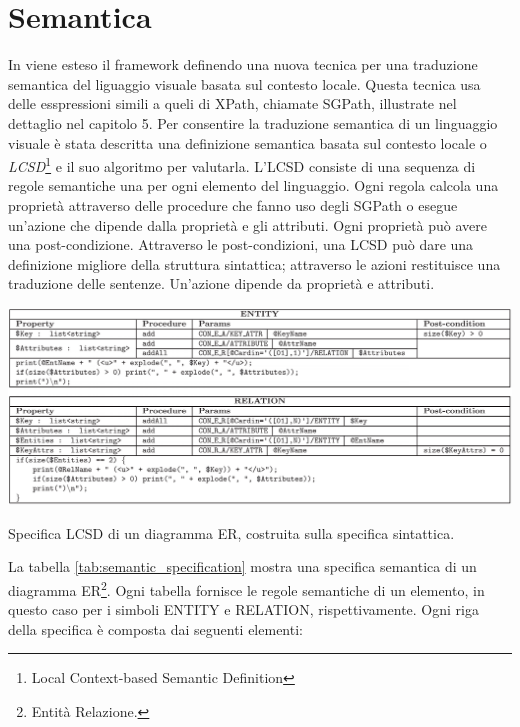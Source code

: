     \section{Semantica}
        In \cite{localcontext} viene esteso il framework definendo una nuova tecnica per una traduzione semantica del liguaggio visuale basata sul contesto locale. Questa tecnica usa delle esspressioni simili a queli di XPath, chiamate SGPath, illustrate nel dettaglio nel capitolo 5.
        \newline
        Per consentire la traduzione semantica di un linguaggio visuale è stata descritta una definizione semantica basata sul contesto locale o \textit{LCSD}\footnote{Local Context-based Semantic Definition} e il suo algoritmo per valutarla. L'LCSD consiste di una sequenza di regole semantiche una per ogni elemento del linguaggio. Ogni regola calcola una proprietà attraverso delle procedure che fanno uso degli SGPath o esegue un'azione che dipende dalla proprietà e gli attributi. Ogni proprietà può avere una post-condizione.
        \newline
        Attraverso le post-condizioni, una LCSD può dare una definizione migliore della struttura sintattica; attraverso le azioni restituisce una traduzione delle sentenze. Un'azione dipende da proprietà e attributi.
        \begin{table}[htbp]
            \centering
            \includegraphics[scale=0.37]{Figure/semantic_specification.PNG}
            \caption{Specifica LCSD di un diagramma ER, costruita sulla specifica sintattica.}
            \label{tab:semantic_specification}
        \end{table}
        \newline
        La tabella \ref{tab:semantic_specification} mostra una specifica semantica di un diagramma ER\footnote{Entità Relazione.}. Ogni tabella fornisce le regole semantiche di un elemento, in questo caso per i simboli ENTITY e RELATION, rispettivamente. Ogni riga della specifica è composta dai seguenti elementi:
